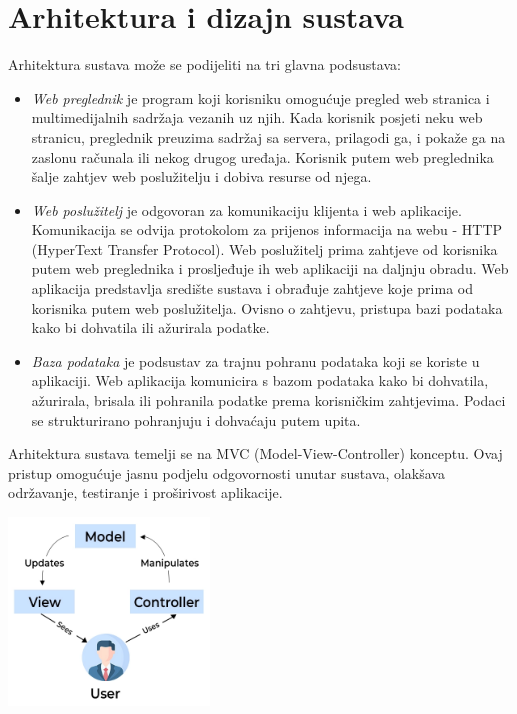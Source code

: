 \chapter{Arhitektura i dizajn sustava}
		
	

	Arhitektura sustava može se podijeliti na tri glavna podsustava:
	
	\begin{itemize}
		\item \textit {Web preglednik} je program koji korisniku omogućuje pregled web stranica i multimedijalnih sadržaja vezanih uz njih. Kada korisnik posjeti neku web stranicu, preglednik preuzima sadržaj sa servera, prilagodi ga, i pokaže ga na zaslonu računala ili nekog drugog uređaja. Korisnik putem web preglednika šalje zahtjev web poslužitelju i dobiva resurse od njega.
		
		\item \textit {Web poslužitelj} je odgovoran za komunikaciju klijenta i web aplikacije. Komunikacija se odvija protokolom za prijenos informacija na webu - HTTP (HyperText Transfer Protocol). Web poslužitelj prima zahtjeve od korisnika putem web preglednika i prosljeđuje ih web aplikaciji na daljnju obradu. Web aplikacija predstavlja središte sustava i obrađuje zahtjeve koje prima od korisnika putem web poslužitelja. Ovisno o zahtjevu, pristupa bazi podataka kako bi dohvatila ili ažurirala podatke. 
		
		\item \textit {Baza podataka} je podsustav za trajnu pohranu podataka koji se koriste u aplikaciji. Web aplikacija komunicira s bazom podataka kako bi dohvatila, ažurirala, brisala ili pohranila podatke prema korisničkim zahtjevima. Podaci se strukturirano pohranjuju i dohvaćaju putem upita. \newline
		
	\end{itemize}
	
		Arhitektura sustava temelji se na MVC (Model-View-Controller) konceptu. Ovaj pristup omogućuje jasnu podjelu odgovornosti unutar sustava, olakšava održavanje, testiranje i proširivost aplikacije. 
		
		\begin{center}
			\includegraphics[width=0.4\textwidth]{slike/mvc.png} %
		\end{center}
		
